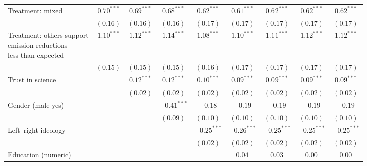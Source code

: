\begin{table}[h]
\begin{center}
\begin{tabular}{l c c c c c c c c}
Treatment: mixed                                                                & $0.70^{***}$ & $0.69^{***}$  & $0.68^{***}$  & $0.62^{***}$  & $0.61^{***}$  & $0.62^{***}$  & $0.62^{***}$  & $0.62^{***}$  \\
                                                                                & $(0.16)$     & $(0.16)$      & $(0.16)$      & $(0.17)$      & $(0.17)$      & $(0.17)$      & $(0.17)$      & $(0.17)$      \\
\shortstack{Treatment: others support\\emission reductions\\less than expected} & $1.10^{***}$ & $1.12^{***}$  & $1.14^{***}$  & $1.08^{***}$  & $1.10^{***}$  & $1.11^{***}$  & $1.12^{***}$  & $1.12^{***}$  \\
                                                                                & $(0.15)$     & $(0.15)$      & $(0.15)$      & $(0.16)$      & $(0.17)$      & $(0.17)$      & $(0.17)$      & $(0.17)$      \\
Trust in science                                                                &              & $0.12^{***}$  & $0.12^{***}$  & $0.10^{***}$  & $0.09^{***}$  & $0.09^{***}$  & $0.09^{***}$  & $0.09^{***}$  \\
                                                                                &              & $(0.02)$      & $(0.02)$      & $(0.02)$      & $(0.02)$      & $(0.02)$      & $(0.02)$      & $(0.02)$      \\
Gender (male yes)                                                               &              &               & $-0.41^{***}$ & $-0.18$       & $-0.19$       & $-0.19$       & $-0.19$       & $-0.19$       \\
                                                                                &              &               & $(0.09)$      & $(0.10)$      & $(0.10)$      & $(0.10)$      & $(0.10)$      & $(0.10)$      \\
Left–right ideology                                                             &              &               &               & $-0.25^{***}$ & $-0.26^{***}$ & $-0.25^{***}$ & $-0.25^{***}$ & $-0.25^{***}$ \\
                                                                                &              &               &               & $(0.02)$      & $(0.02)$      & $(0.02)$      & $(0.02)$      & $(0.02)$      \\
Education (numeric)                                                             &              &               &               &               & $0.04$        & $0.03$        & $0.00$        & $0.00$        \\

\end{tabular}
\end{center}
\end{table}
